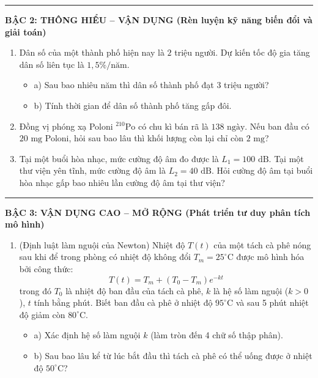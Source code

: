 \documentclass[12pt, a4paper]{article}
\begin{document}
\begin{tcolorbox}[enhanced, colback=white, colframe=blue!70!black, arc=1.5mm, title=\textbf{PHIẾU HỌC TẬP: MỘT VÀI MÔ HÌNH TOÁN HỌC SỬ DỤNG HÀM SỐ MŨ VÀ LÔGARIT}]
\vspace{5pt}
\hrule
\vspace{5pt}

\textbf{\large BẬC 2: THÔNG HIỂU -- VẬN DỤNG (Rèn luyện kỹ năng biến đổi và giải toán)}
\begin{enumerate}[label=\textbf{Bài 2.\arabic*.}]
    \item Dân số của một thành phố hiện nay là $2$ triệu người. Dự kiến tốc độ gia tăng dân số liên tục là $1{,}5\%/\text{năm}$.
    \begin{itemize}[leftmargin=0.6cm]
        \item a) Sau bao nhiêu năm thì dân số thành phố đạt $3$ triệu người?
        \item b) Tính thời gian để dân số thành phố tăng gấp đôi.
    \end{itemize}
    \item Đồng vị phóng xạ Poloni $^{210}\text{Po}$ có chu kì bán rã là $138\text{ ngày}$. Nếu ban đầu có $20\text{ mg}$ Poloni, hỏi sau bao lâu thì khối lượng còn lại chỉ còn $2\text{ mg}$?
    \item Tại một buổi hòa nhạc, mức cường độ âm đo được là $L_1 = 100\text{ dB}$. Tại một thư viện yên tĩnh, mức cường độ âm là $L_2 = 40\text{ dB}$. Hỏi cường độ âm tại buổi hòa nhạc gấp bao nhiêu lần cường độ âm tại thư viện?
\end{enumerate}

\vspace{5pt}
\hrule
\vspace{5pt}

\textbf{\large BẬC 3: VẬN DỤNG CAO -- MỞ RỘNG (Phát triển tư duy phân tích mô hình)}
\begin{enumerate}[label=\textbf{Bài 3.\arabic*.}]
    \item (Định luật làm nguội của Newton) Nhiệt độ $T(t)$ của một tách cà phê nóng sau khi để trong phòng có nhiệt độ không đổi $T_m = 25^\circ\text{C}$ được mô hình hóa bởi công thức:
    $$T(t) = T_m + (T_0 - T_m) e^{-kt}$$
    trong đó $T_0$ là nhiệt độ ban đầu của tách cà phê, $k$ là hệ số làm nguội ($k > 0$), $t$ tính bằng phút. Biết ban đầu cà phê ở nhiệt độ $95^\circ\text{C}$ và sau 5 phút nhiệt độ giảm còn $80^\circ\text{C}$.
    \begin{itemize}[leftmargin=0.6cm]
        \item a) Xác định hệ số làm nguội $k$ (làm tròn đến 4 chữ số thập phân).
        \item b) Sau bao lâu kể từ lúc bắt đầu thì tách cà phê có thể uống được ở nhiệt độ $50^\circ\text{C}$?
    \end{itemize}
\end{enumerate}
\end{tcolorbox}
\end{document}
